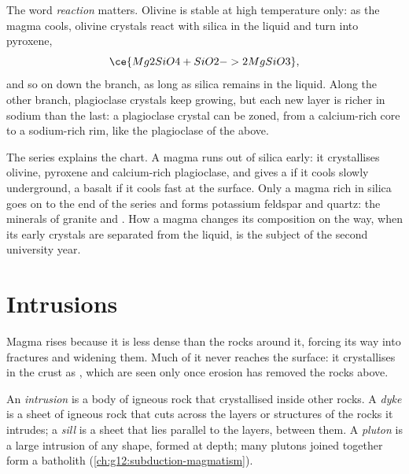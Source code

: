 The word \emph{reaction} matters. Olivine is stable at high temperature
only: as the magma cools, olivine crystals react with silica in the liquid
and turn into pyroxene,
\[
  \ce{Mg2SiO4 + SiO2 -> 2 MgSiO3},
\]
and so on down the branch, as long as silica remains in the liquid. Along
the other branch, plagioclase crystals keep growing, but each new layer is
richer in sodium than the last: a plagioclase crystal can be zoned, from a
calcium-rich core to a sodium-rich rim, like the plagioclase  of
the  above.

The series explains the chart. A  magma runs out of silica early: it
crystallises olivine, pyroxene and calcium-rich plagioclase, and gives a
 if it cools slowly underground, a basalt if it cools fast at the
surface. Only a magma rich in silica goes on to the end of the series and
forms potassium feldspar and quartz: the minerals of granite and .
How a magma changes its composition on the way, when its early crystals are
separated from the liquid, is the subject of the second university year.

\section{Intrusions}

Magma rises because it is less dense than the rocks around it, forcing its
way into fractures and widening them. Much of it never reaches the surface:
it crystallises in the crust as , which are seen only once
erosion has removed the rocks above.

\begin{definition}\label{def:g11:igneous-rocks:intrusion}
An \emph{intrusion} is a body of igneous rock that
crystallised inside other rocks. A \emph{dyke} is a sheet of
igneous rock that cuts across the layers or structures of the rocks it
intrudes; a \emph{sill} is a sheet that lies parallel to the
layers, between them. A \emph{pluton} is a large intrusion of
any shape, formed at depth; many plutons joined together form a
batholith (\cref{ch:g12:subduction-magmatism}).
\end{definition}

